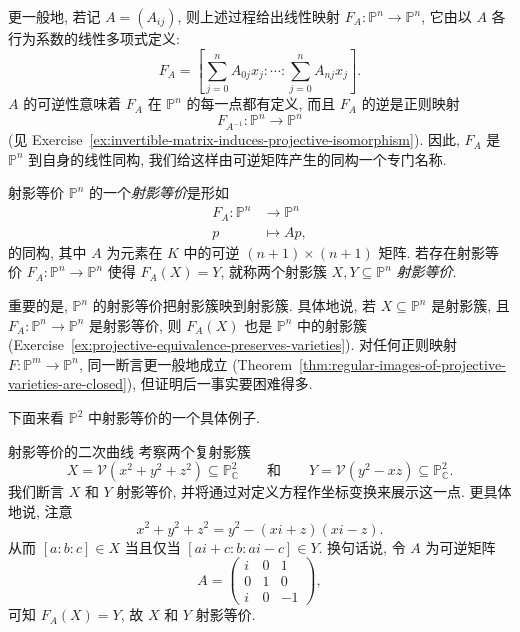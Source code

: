 更一般地, 若记 $A=(A_{ij})$, 则上述过程给出线性映射 $F_{A}:\mathbb{P}^{n}\to\mathbb{P}^{n}$, 它由以 $A$ 各行为系数的线性多项式定义:
\[
  F_{A}=\left[\sum_{j=0}^{n}A_{0j}x_{j}:\cdots:\sum_{j=0}^{n}A_{nj}x_{j}\right].
\]
$A$ 的可逆性意味着 $F_{A}$ 在 $\mathbb{P}^{n}$ 的每一点都有定义, 而且 $F_{A}$ 的逆是正则映射
\[
  F_{A^{-1}}:\mathbb{P}^{n}\to\mathbb{P}^{n}
\]
(见 Exercise~\ref{ex:invertible-matrix-induces-projective-isomorphism}). 因此, $F_{A}$ 是 $\mathbb{P}^{n}$ 到自身的线性同构, 我们给这样由可逆矩阵产生的同构一个专门名称.

\begin{Definition}{射影等价}\leavevmode\label{def:projective-equivalence}
$\mathbb{P}^{n}$ 的一个\emph{射影等价}是形如
\[
  \begin{aligned}
    F_{A}:\mathbb{P}^{n}&\to\mathbb{P}^{n}\\
    p&\mapsto Ap,
  \end{aligned}
\]
的同构, 其中 $A$ 为元素在 $K$ 中的可逆 $(n+1)\times(n+1)$ 矩阵. 若存在射影等价 $F_{A}:\mathbb{P}^{n}\to\mathbb{P}^{n}$ 使得 $F_{A}(X)=Y$, 就称两个射影簇 $X,Y\subseteq\mathbb{P}^{n}$ \emph{射影等价}.
\end{Definition}

重要的是, $\mathbb{P}^{n}$ 的射影等价把射影簇映到射影簇. 具体地说, 若 $X\subseteq\mathbb{P}^{n}$ 是射影簇, 且 $F_{A}:\mathbb{P}^{n}\to\mathbb{P}^{n}$ 是射影等价, 则 $F_{A}(X)$ 也是 $\mathbb{P}^{n}$ 中的射影簇 (Exercise~\ref{ex:projective-equivalence-preserves-varieties}). 对任何正则映射 $F:\mathbb{P}^{m}\to\mathbb{P}^{n}$, 同一断言更一般地成立 (Theorem~\ref{thm:regular-images-of-projective-varieties-are-closed}), 但证明后一事实要困难得多.

下面来看 $\mathbb{P}^{2}$ 中射影等价的一个具体例子.

\begin{Example}{射影等价的二次曲线}\leavevmode\label{ex:projectively-equivalent-complex-conics}
考察两个复射影簇
\[
  X=\mathcal{V}(x^{2}+y^{2}+z^{2})\subseteq\mathbb{P}^{2}_{\mathbb{C}}
  \qquad\text{和}\qquad
  Y=\mathcal{V}(y^{2}-xz)\subseteq\mathbb{P}^{2}_{\mathbb{C}}.
\]
我们断言 $X$ 和 $Y$ 射影等价, 并将通过对定义方程作坐标变换来展示这一点. 更具体地说, 注意
\[
  x^{2}+y^{2}+z^{2}=y^{2}-(xi+z)(xi-z).
\]
从而 $[a:b:c]\in X$ 当且仅当 $[ai+c:b:ai-c]\in Y$. 换句话说, 令 $A$ 为可逆矩阵
\[
  A=\begin{pmatrix}
    i&0&1\\
    0&1&0\\
    i&0&-1
  \end{pmatrix},
\]
可知 $F_{A}(X)=Y$, 故 $X$ 和 $Y$ 射影等价.
\end{Example}

